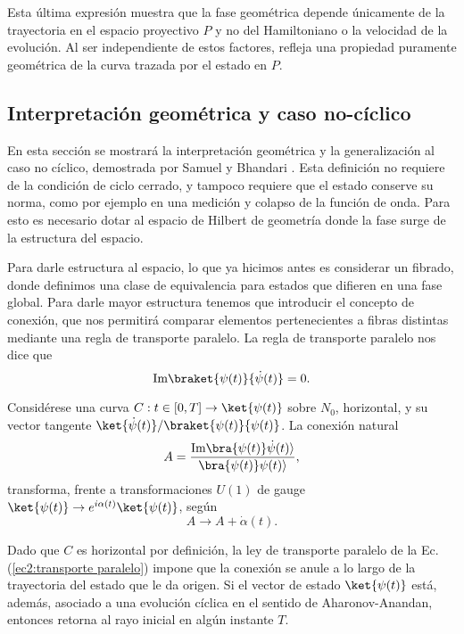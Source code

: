 Esta última expresión muestra que la fase geométrica depende únicamente de la trayectoria en el espacio proyectivo \( P \) y no del Hamiltoniano o la velocidad de la evolución. Al ser independiente de estos factores, refleja una propiedad puramente geométrica de la curva trazada por el estado en \( P \).



\subsection{Interpretación geométrica y caso no-cíclico}\label{sec2:no ciclico}
En esta sección se mostrará la interpretación geométrica y la generalización al caso no cíclico, demostrada por Samuel y Bhandari \cite{Bhandari1988}. Esta definición no requiere de la condición de ciclo cerrado, y tampoco requiere que el estado conserve su norma, como por ejemplo en una medición y colapso de la función de onda. Para esto es necesario dotar al espacio de Hilbert de geometría donde la fase surge de la estructura del espacio.

Para darle estructura al espacio, lo que ya hicimos antes es considerar un fibrado, donde definimos una clase de equivalencia para estados que difieren en una fase global. Para darle mayor estructura tenemos que introducir el concepto de conexión, que nos permitirá comparar elementos pertenecientes a fibras distintas mediante una regla de transporte paralelo. La regla de transporte paralelo nos dice que
\begin{equation} \label{ec2:transporte paralelo}
    \text{Im} \braket{\psi(t)}{\dot \psi(t)}=0. 
\end{equation}

Considérese una curva \( C: t \in [0, T] \to \ket{\psi(t)} \) sobre \( N_0 \), horizontal, y su vector tangente $\ket{\dot{\psi}(t)}/\braket{\psi(t)}{\psi(t)}$. La conexión natural
\begin{equation}
A = \frac{\text{Im} \bra{\psi(t)} \dot{\psi}(t) \rangle}{\bra{\psi(t)} \psi(t) \rangle},
\end{equation}
transforma, frente a transformaciones \( U(1) \) de gauge \( \ket{\psi(t)} \to e^{i\alpha(t)} \ket{\psi(t)} \), según
\begin{equation} \label{ec2:transformación de gauge}
A \to A + \dot{\alpha}(t).
\end{equation}

Dado que \( C \) es horizontal por definición, la ley de transporte paralelo de la Ec. (\ref{ec2:transporte paralelo}) impone que la conexión se anule a lo largo de la trayectoria del estado que le da origen. Si el vector de estado \( \ket{\psi(t)} \) está, además, asociado a una evolución cíclica en el sentido de Aharonov-Anandan, entonces retorna al rayo inicial en algún instante \( T \).


